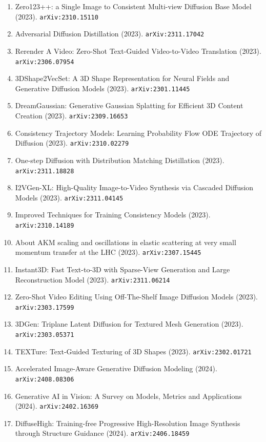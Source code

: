 \documentclass[11pt]{article}
\begin{document}
\begin{enumerate}
  \item Zero123++: a Single Image to Consistent Multi-view Diffusion Base Model (2023). \texttt{arXiv:2310.15110}
  \item Adversarial Diffusion Distillation (2023). \texttt{arXiv:2311.17042}
  \item Rerender A Video: Zero-Shot Text-Guided Video-to-Video Translation (2023). \texttt{arXiv:2306.07954}
  \item 3DShape2VecSet: A 3D Shape Representation for Neural Fields and
  Generative Diffusion Models (2023). \texttt{arXiv:2301.11445}
  \item DreamGaussian: Generative Gaussian Splatting for Efficient 3D Content
  Creation (2023). \texttt{arXiv:2309.16653}
  \item Consistency Trajectory Models: Learning Probability Flow ODE Trajectory
  of Diffusion (2023). \texttt{arXiv:2310.02279}
  \item One-step Diffusion with Distribution Matching Distillation (2023). \texttt{arXiv:2311.18828}
  \item I2VGen-XL: High-Quality Image-to-Video Synthesis via Cascaded Diffusion
  Models (2023). \texttt{arXiv:2311.04145}
  \item Improved Techniques for Training Consistency Models (2023). \texttt{arXiv:2310.14189}
  \item About AKM scaling and oscillations in elastic scattering at very small
  momentum transfer at the LHC (2023). \texttt{arXiv:2307.15445}
  \item Instant3D: Fast Text-to-3D with Sparse-View Generation and Large
  Reconstruction Model (2023). \texttt{arXiv:2311.06214}
  \item Zero-Shot Video Editing Using Off-The-Shelf Image Diffusion Models (2023). \texttt{arXiv:2303.17599}
  \item 3DGen: Triplane Latent Diffusion for Textured Mesh Generation (2023). \texttt{arXiv:2303.05371}
  \item TEXTure: Text-Guided Texturing of 3D Shapes (2023). \texttt{arXiv:2302.01721}
  \item Accelerated Image-Aware Generative Diffusion Modeling (2024). \texttt{arXiv:2408.08306}
  \item Generative AI in Vision: A Survey on Models, Metrics and Applications (2024). \texttt{arXiv:2402.16369}
  \item DiffuseHigh: Training-free Progressive High-Resolution Image Synthesis
  through Structure Guidance (2024). \texttt{arXiv:2406.18459}

\end{enumerate}
\end{document}
